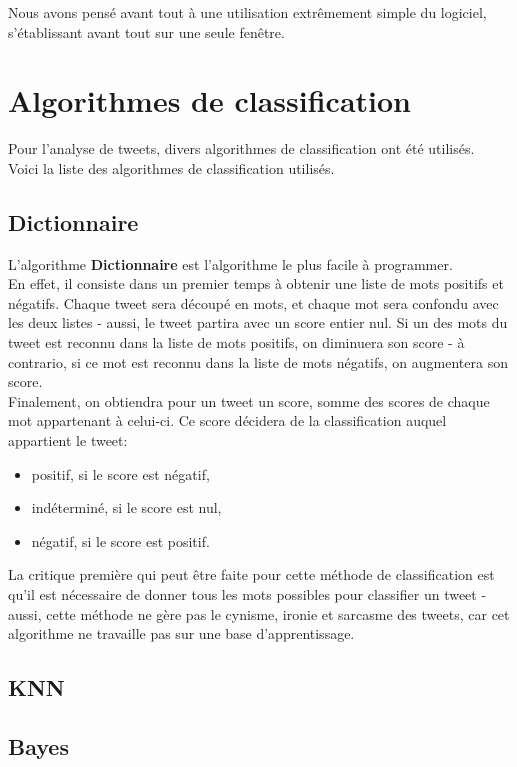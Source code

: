 \documentclass[pdftex,12pt,a4paper]{report}
\begin{document}
\begin{spacing}{1.2}
Nous avons pensé avant tout à une utilisation extrêmement simple du logiciel, s'établissant avant tout sur une seule fenêtre.\\

\chapter{Algorithmes de classification}

Pour l'analyse de tweets, divers algorithmes de classification ont été utilisés.\\
Voici la liste des algorithmes de classification utilisés.

\section{Dictionnaire}

L'algorithme \textbf{Dictionnaire} est l'algorithme le plus facile à programmer.\\
En effet, il consiste dans un premier temps à obtenir une liste de mots positifs et négatifs. Chaque tweet sera découpé en mots, et chaque mot sera confondu avec les deux listes - aussi, le tweet partira avec un score entier nul. Si un des mots du tweet est reconnu dans la liste de mots positifs, on diminuera son score - à contrario, si ce mot est reconnu dans la liste de mots négatifs, on augmentera son score.\\
Finalement, on obtiendra pour un tweet un score, somme des scores de chaque mot appartenant à celui-ci. Ce score décidera de la classification auquel appartient le tweet:
\begin{itemize}
\item{positif, si le score est négatif,}
\item{indéterminé, si le score est nul,}
\item{négatif, si le score est positif.}
\end{itemize}
La critique première qui peut être faite pour cette méthode de classification est qu'il est nécessaire de donner tous les mots possibles pour classifier un tweet - aussi, cette méthode ne gère pas le cynisme, ironie et sarcasme des tweets, car cet algorithme ne travaille pas sur une base d'apprentissage.

\section{KNN}

\section{Bayes}


\end{spacing}
\end{document}
